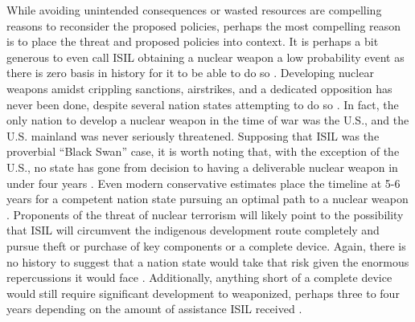 \documentclass{report}
\begin{document}
While avoiding unintended consequences or wasted resources are compelling reasons to reconsider the proposed policies, perhaps the most compelling reason is to place the threat and proposed policies into context.  It is perhaps a bit generous to even call ISIL obtaining a nuclear weapon a low probability event as there is zero basis in history for it to be able to do so \cite{pollack2014unthinkable,Bracken2013,Nacht1867,Reed2010,Agency2004}. Developing nuclear weapons amidst crippling sanctions, airstrikes, and a dedicated opposition has never been done, despite several nation states attempting to do so \cite{Reed2010,Agency2004}.  In fact, the only nation to develop a nuclear weapon in the time of war was the U.S., and the U.S. mainland was never seriously threatened. Supposing that ISIL was the proverbial \enquote{Black Swan} case, it is worth noting that, with the exception of the U.S., no state has gone from decision to having a deliverable nuclear weapon in under four years \cite{Reed2010}. Even modern conservative estimates place the timeline at 5-6 years for a competent nation state pursuing an optimal path to a nuclear weapon \cite{Harney2006}. Proponents of the threat of nuclear terrorism will likely point to the possibility that ISIL will circumvent the indigenous development route completely and pursue theft or purchase of key components or a complete device.  Again, there is no history to suggest that a nation state would take that risk given the enormous repercussions it would face \cite{pollack2014unthinkable}.  Additionally, anything short of a complete device would still require significant development to weaponized, perhaps three to four years depending on the amount of assistance ISIL received \cite{Harney2006}.  
\end{document}
